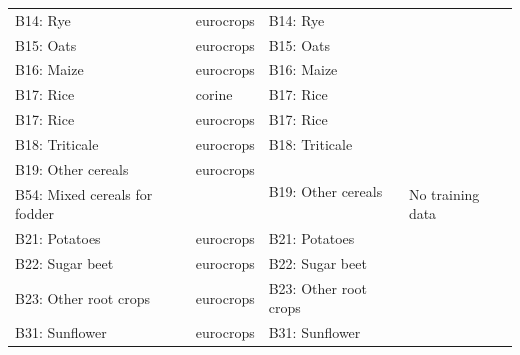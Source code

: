 \begin{table}[]
\begin{tabular}{l{2cm}lll}
B14: Rye                                      & eurocrops               & B14: Rye                                              &                                                           \\
B15: Oats                                     & eurocrops               & B15: Oats                                             &                                                           \\
B16: Maize                                    & eurocrops               & B16: Maize                                            &                                                           \\
B17: Rice                                     & corine                  & B17: Rice                                             &                                                           \\
B17: Rice                                     & eurocrops               & B17: Rice                                             &                                                           \\
B18: Triticale                                & eurocrops               & B18: Triticale                                        &                                                           \\
B19: Other cereals                            & eurocrops               & \multirow{2}{*}{B19: Other cereals}                   &                                                           \\
B54: Mixed cereals for fodder                 &                         &                                                       & No training data                                          \\
B21: Potatoes                                 & eurocrops               & B21: Potatoes                                         &                                                           \\
B22: Sugar beet                               & eurocrops               & B22: Sugar beet                                       &                                                           \\
B23: Other root crops                         & eurocrops               & B23: Other root crops                                 &                                                           \\
B31: Sunflower                                & eurocrops               & B31: Sunflower                                        &                                                           \\

\end{tabular}
\end{table}
